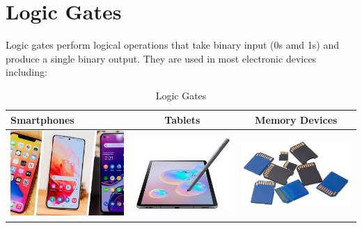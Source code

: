 \documentclass{article}
\begin{document}
	\section{Logic Gates}
	Logic gates perform logical operations that take binary input (0s amd 1s) and produce a single binary output. They are used in most electronic devices including:
	
	\begin{table}[h!]
		\begin{center}
			\caption{Logic Gates}
			\label{tab:table1}
			\begin{tabular}{|l|c|c|}
				\hline
				Smartphones
				&
				Tablets
				&
				Memory Devices
				\\
				\hline
				\includegraphics[width=0.2\linewidth]{smartphone}
				
				&
				\includegraphics[width=0.25\linewidth]{tablet}
				&
				\includegraphics[width=0.2\linewidth]{sd card}
				\\
				 \hline
				 
				 \end{tabular}
		\end{center}
	\end{table}  
\end{document}
